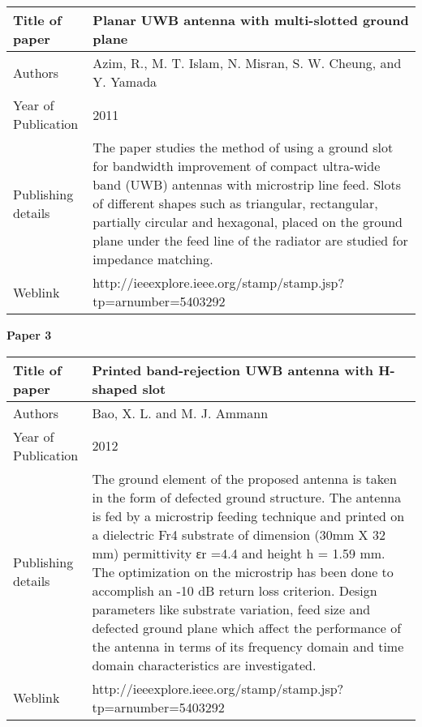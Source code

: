 	 \begin{center}
	 	\begin{table}[h]
	 		\centering
	 		\begin{tabular}{ |l|p{11cm}| }
	 			\hline
	 			Title of paper &  Planar UWB antenna with multi-slotted ground plane \\
	 			\hline
	 			Authors & Azim, R., M. T. Islam, N. Misran, S. W. Cheung, and Y. Yamada \\
	 			\hline
	 			Year of Publication & 2011 \\
	 			\hline
	 			Publishing details & The paper studies the method of using a ground slot for bandwidth improvement of compact ultra-wide band (UWB) antennas with microstrip line feed. Slots of different shapes such as triangular, rectangular, partially circular and hexagonal, placed on the ground plane under the feed line of the radiator are studied for impedance matching.\\
	 			\hline
	 			Weblink & http://ieeexplore.ieee.org/stamp/stamp.jsp?tp=arnumber=5403292 \\
	 			\hline
	 		\end{tabular}

	 	\end{table}
	 \end{center}

	\cleardoublepage
	
		\begin{flushleft}
			\textbf{Paper 3}
		\end{flushleft}
		

	  \begin{center}
	  	\begin{table}[h]
	  		\centering
	  		\begin{tabular}{ |l|p{11cm}| }
	  			\hline
	  			Title of paper &  Printed band-rejection UWB antenna with H-shaped slot \\
	  			\hline
	  			Authors & Bao, X. L. and M. J. Ammann \\
	  			\hline
	  			Year of Publication & 2012 \\
	  			\hline
	  			Publishing details & The ground element of the proposed antenna is taken in the form of defected ground structure. The antenna is fed by a microstrip feeding technique and printed on a dielectric Fr4 substrate of dimension (30mm X 32 mm) permittivity εr =4.4 and height h = 1.59 mm. The optimization on the microstrip has been done to accomplish an -10 dB return loss criterion. Design parameters like substrate variation, feed size and defected ground plane which affect the performance of the antenna in terms of its frequency domain and time domain characteristics are investigated.\\
	  			\hline
	  			Weblink & http://ieeexplore.ieee.org/stamp/stamp.jsp?tp=arnumber=5403292 \\
	  			\hline
	  		\end{tabular}

	  	\end{table}
	  \end{center}

